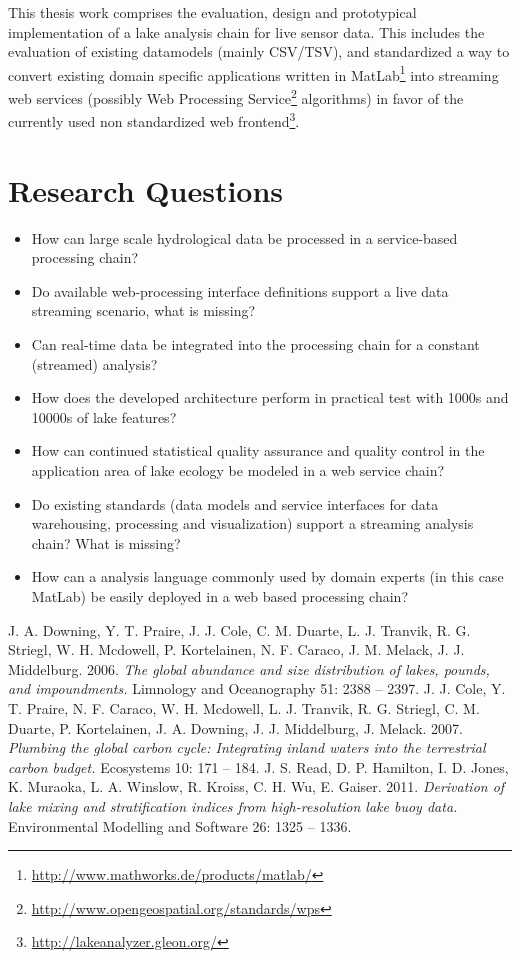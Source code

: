 \documentclass[paper=a4,fontsize=11pt]{scrartcl}
\newcommand{\fu}[1]{\footnote{\url{#1}}}
\begin{document}
    This thesis work comprises the evaluation, design and prototypical implementation of a lake analysis chain for live sensor data.
    This includes the evaluation of existing datamodels (mainly CSV/TSV), and standardized a way to convert existing domain specific applications written in MatLab\fu{http://www.mathworks.de/products/matlab/} into streaming web services (possibly Web Processing Service\fu{http://www.opengeospatial.org/standards/wps} algorithms) in favor of the currently used non standardized web frontend\fu{http://lakeanalyzer.gleon.org/}.

    \section*{Research Questions}
    \begin{itemize}
        \item How can large scale hydrological data be processed in a service-based processing chain?
        \item Do available web-processing interface definitions support a live data streaming scenario, what is missing?
        \item Can real-time data be integrated into the processing chain for a constant (streamed) analysis?
        \item How does the developed architecture perform in practical test with 1000s and 10000s of lake features?
        \item How can continued statistical quality assurance and quality control in the application area of lake ecology be modeled in a web service chain?
        \item Do existing standards (data models and service interfaces for data warehousing, processing and visualization) support a streaming analysis chain? What is missing?
        \item How can a analysis language commonly used by domain experts (in this case MatLab) be easily deployed in a web based processing chain?
    \end{itemize}

    \clearpage
    \begin{thebibliography}{12}
            J. A. Downing, Y. T. Praire, J. J. Cole, C. M. Duarte, L. J. Tranvik, R. G. Striegl, W. H. Mcdowell, P. Kortelainen, N. F. Caraco, J. M. Melack, J. J. Middelburg.
            2006.
            \emph{The global abundance and size distribution of lakes, pounds, and impoundments.}
            Limnology and Oceanography 51: 2388 -- 2397.
            J. J. Cole, Y. T. Praire, N. F. Caraco, W. H. Mcdowell, L. J. Tranvik, R. G. Striegl, C. M. Duarte, P. Kortelainen, J. A. Downing, J. J. Middelburg, J. Melack.
            2007.
            \emph{Plumbing the global carbon cycle: Integrating inland waters into the terrestrial carbon budget.}
            Ecosystems 10: 171 -- 184.
            J. S. Read, D. P. Hamilton, I. D. Jones, K. Muraoka, L. A. Winslow, R. Kroiss, C. H. Wu, E. Gaiser.
            2011.
            \emph{Derivation of lake mixing and stratification indices from high-resolution lake buoy data.}
            Environmental Modelling and Software 26: 1325 -- 1336.
    \end{thebibliography}
\end{document}
